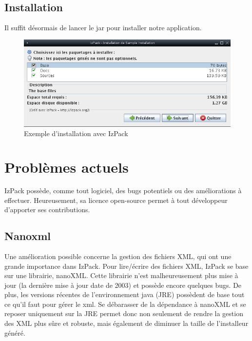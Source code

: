 \subsection{Installation}
Il suffit désormais de lancer le jar pour installer notre application.
\begin{figure}[H]
	\centering
	\includegraphics[width=15cm]{../image/installSample.png}
	\caption{Exemple d'installation avec IzPack}
\end{figure}

\section{Problèmes actuels}
IzPack possède, comme tout logiciel, des bugs potentiels ou des améliorations à effectuer.
Heureusement, sa licence open-source permet à tout développeur d'apporter ses contributions.

\subsection{Nanoxml}
Une amélioration possible concerne la gestion des fichiers XML, qui ont une grande importance dans IzPack.
Pour lire/écrire des fichiers XML, IzPack se base sur une librairie, nanoXML. Cette librairie n'est malheureusement plus mise à jour (la dernière mise à jour date de 2003) et possède encore quelques bugs.
De plus, les versions récentes de l'environnement java (JRE) possèdent de base tout ce qu'il faut pour gérer le xml.
Se débarasser de la dépendance à nanoXML et se reposer uniquement sur la JRE permet donc non seulement de rendre la gestion des XML plus sûre et robuste, mais également de diminuer la taille de l'installeur généré.